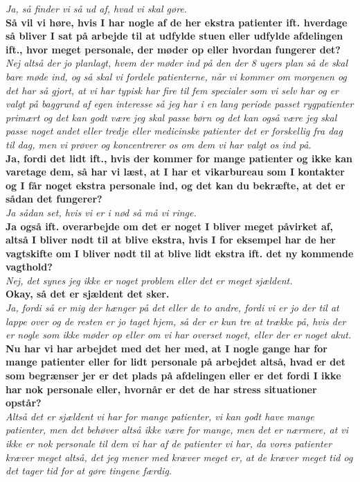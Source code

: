 \noindent
\textit{Ja, så finder vi så ud af, hvad vi skal gøre.}\\
\noindent
\textbf{Så vil vi høre, hvis I har nogle af de her ekstra patienter ift. hverdage så bliver I sat på arbejde til at udfylde stuen eller udfylde afdelingen ift., hvor meget personale, der møder op eller hvordan fungerer det?}\\
\noindent
\textit{Nej altså der jo planlagt, hvem der møder ind på den der 8 ugers plan så de skal bare møde ind, og så skal vi fordele patienterne, når vi kommer om morgenen og det har så gjort, at vi har typisk har fire til fem specialer som vi selv har og er valgt på baggrund af egen interesse så jeg har i en lang periode passet rygpatienter primært og det kan godt være jeg skal passe børn og det kan også være jeg skal passe noget andet eller tredje eller medicinske patienter det er forskellig fra dag til dag, men vi prøver og koncentrerer os om dem vi har valgt os ind på.}\\
\noindent
\textbf{Ja, fordi det lidt ift., hvis der kommer for mange patienter og ikke kan varetage dem, så har vi læst, at I har et vikarbureau som I kontakter og I får noget ekstra personale ind, og det kan du bekræfte, at det er sådan det fungerer?} \\
\noindent
\textit{Ja sådan set, hvis vi er i nød så må vi ringe.}\\
\noindent
\textbf{Ja også ift. overarbejde om det er noget I bliver meget påvirket af, altså I bliver nødt til at blive ekstra, hvis I for eksempel har de her vagtskifte om I bliver nødt til at blive lidt ekstra ift. det ny kommende vagthold?}\\
\noindent
\textit{Nej, det synes jeg ikke er noget problem eller det er meget sjældent.}\\
\noindent
\textbf{Okay, så det er sjældent det sker.}\\
\noindent
\textit{ Ja, fordi så er mig der hænger på det eller de to andre, fordi vi er jo der til at lappe over og de resten er jo taget hjem, så der er kun tre at trække på, hvis der er nogle som ikke møder op eller om vi har overset noget, eller der er noget akut. }\\
\noindent
\textbf{Nu har vi har arbejdet med det her med, at I nogle gange har for mange patienter eller for lidt personale på arbejdet altså, hvad er det som begrænser jer er det plads på afdelingen eller er det fordi I ikke har nok personale eller, hvornår er det de har stress situationer opstår?}\\
\noindent
\textit{Altså det er sjældent vi har for mange patienter, vi kan godt have mange patienter, men det behøver altså ikke være for mange, men det er nærmere, at vi ikke er nok personale til dem vi har af de patienter vi har, da vores patienter kræver meget altså, det jeg mener med kræver meget er, at de kræver meget tid og det tager tid for at gøre tingene færdig.}\\ 
